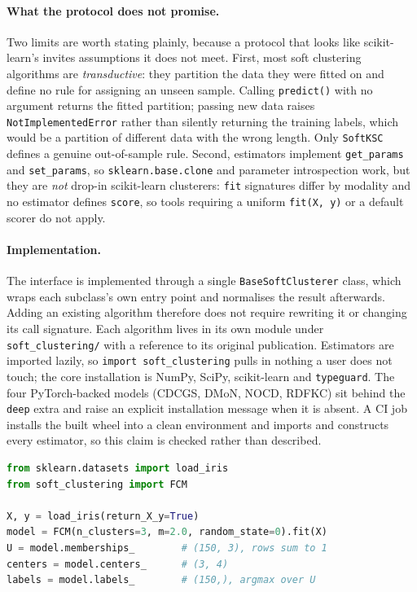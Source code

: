 \documentclass[twoside,11pt]{article}
\begin{document}
\paragraph{What the protocol does not promise.}
Two limits are worth stating plainly, because a protocol that looks like
scikit-learn's invites assumptions it does not meet. First, most soft
clustering algorithms are \emph{transductive}: they partition the data they
were fitted on and define no rule for assigning an unseen sample. Calling
\texttt{predict()} with no argument returns the fitted partition; passing new
data raises \texttt{NotImplementedError} rather than silently returning the
training labels, which would be a partition of different data with the wrong
length. Only \texttt{SoftKSC} defines a genuine out-of-sample rule. Second,
estimators implement \texttt{get\_params} and \texttt{set\_params}, so
\texttt{sklearn.base.clone} and parameter introspection work, but they are
\emph{not} drop-in scikit-learn clusterers: \texttt{fit} signatures differ by
modality and no estimator defines \texttt{score}, so tools requiring a
uniform \texttt{fit(X, y)} or a default scorer do not apply.

\paragraph{Implementation.}
The interface is implemented through a single \texttt{BaseSoftClusterer}
class, which wraps each subclass's own entry point and normalises the result
afterwards. Adding an existing algorithm therefore does not require rewriting
it or changing its call signature. Each algorithm lives in its own module
under \texttt{soft\_clustering/} with a reference to its original
publication. Estimators are imported lazily, so \texttt{import
soft\_clustering} pulls in nothing a user does not touch; the core
installation is NumPy, SciPy, scikit-learn and \texttt{typeguard}. The four
PyTorch-backed models (CDCGS, DMoN, NOCD, RDFKC) sit behind the \texttt{deep}
extra and raise an explicit installation message when it is absent. A CI job
installs the built wheel into a clean environment and imports and constructs
every estimator, so this claim is checked rather than described.

\begin{lstlisting}[language=Python, caption={Fitting an estimator (FCM) and reading its soft output.}]
from sklearn.datasets import load_iris
from soft_clustering import FCM

X, y = load_iris(return_X_y=True)
model = FCM(n_clusters=3, m=2.0, random_state=0).fit(X)
U = model.memberships_        # (150, 3), rows sum to 1
centers = model.centers_      # (3, 4)
labels = model.labels_        # (150,), argmax over U
\end{lstlisting}
\end{document}
